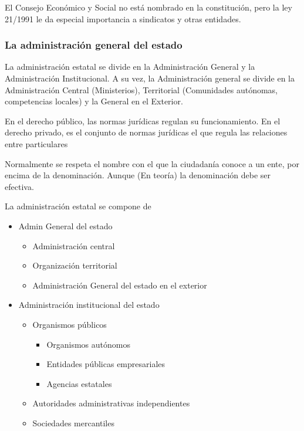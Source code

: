     El Consejo Económico y Social no está nombrado en la constitución, pero la ley 21/1991 le da especial importancia a sindicatos y otras entidades.

    \noindent{}

\subsubsection{La administración general del estado}

    La administración estatal se divide en la Administración General y la Administración Institucional. A su vez, la Administración general se divide en la Administración Central (Ministerios), Territorial (Comunidades autónomas, competencias locales) y la General en el Exterior.

    En el derecho público, las normas jurídicas regulan su funcionamiento. En el derecho privado, es el conjunto de normas jurídicas el que regula las relaciones entre particulares

    Normalmente se respeta el nombre con el que la ciudadanía conoce a un ente, por encima de la denominación. Aunque (En teoría) la denominación debe ser efectiva.

    La administración estatal se compone de
    \begin{itemize}
        \item Admin General del estado
        \begin{itemize}
            \item Administración central
            \item Organización territorial
            \item Administración General del estado en el exterior
        \end{itemize}
        \item Administración institucional del estado
        \begin{itemize}
            \item Organismos públicos
            \begin{itemize}
                \item Organismos autónomos
                \item Entidades públicas empresariales
                \item Agencias estatales
            \end{itemize}
            \item Autoridades administrativas independientes
            \item Sociedades mercantiles
        \end{itemize}
    \end{itemize}

